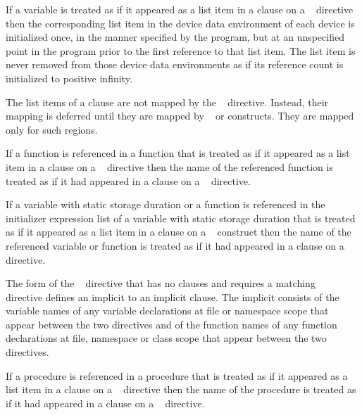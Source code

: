 {{{{\begin{samepage}
\end{samepage}

If a variable is treated as if it appeared as a list item in a 
clause on a ~ directive then the corresponding list
item in the device data environment of each device is initialized once, in the
manner specified by the program, but at an unspecified point in the program
prior to the first reference to that list item.  The list item is never removed
from those device data environments as if its reference count is initialized to
positive infinity.

The list items of a  clause are not mapped 
by the ~ directive. Instead, their mapping
is deferred until they are mapped by ~ 
or  constructs. They are mapped only for such regions.

\pagebreak
\ccppspecificstart
If a function is referenced in a function that is treated as if it appeared as
a list item in a  clause on a ~ directive
then the name of the referenced function is treated as if it had appeared in a
 clause on a ~ directive.

If a variable with static storage duration or a function is referenced in the
initializer expression list of a variable with static storage duration that is
treated as if it appeared as a list item in a  clause on a
~ construct then the name of the referenced variable
or function is treated as if it had appeared in a  clause on a
~ directive.

The form of the ~ directive that has no clauses 
and requires a matching ~~ directive
defines an implicit  to an implicit 
clause. The implicit  consists of the variable names 
of any variable declarations at file or namespace scope that appear between 
the two directives and of the function names of any function declarations at 
file, namespace or class scope that appear between the two directives.
\ccppspecificend

\fortranspecificstart
If a procedure is referenced in a procedure that is treated as if it appeared
as a list item in a  clause on a ~
directive then the name of the procedure is treated as if it had appeared in a
 clause on a ~ directive.

}}}}
